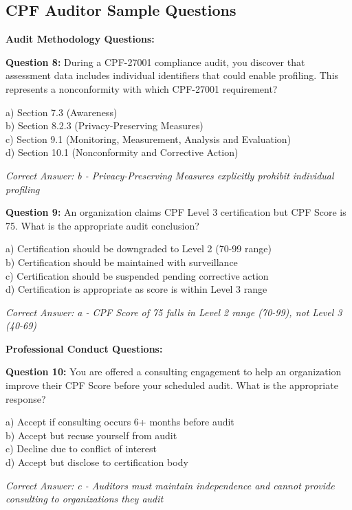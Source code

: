 \documentclass[11pt,a4paper]{article}
\begin{document}
\subsection{CPF Auditor Sample Questions}

\textbf{Audit Methodology Questions:}

\textbf{Question 8:} During a CPF-27001 compliance audit, you discover that assessment data includes individual identifiers that could enable profiling. This represents a nonconformity with which CPF-27001 requirement?

a) Section 7.3 (Awareness)\\
b) Section 8.2.3 (Privacy-Preserving Measures)\\
c) Section 9.1 (Monitoring, Measurement, Analysis and Evaluation)\\
d) Section 10.1 (Nonconformity and Corrective Action)

\textit{Correct Answer: b - Privacy-Preserving Measures explicitly prohibit individual profiling}

\textbf{Question 9:} An organization claims CPF Level 3 certification but CPF Score is 75. What is the appropriate audit conclusion?

a) Certification should be downgraded to Level 2 (70-99 range)\\
b) Certification should be maintained with surveillance\\
c) Certification should be suspended pending corrective action\\
d) Certification is appropriate as score is within Level 3 range

\textit{Correct Answer: a - CPF Score of 75 falls in Level 2 range (70-99), not Level 3 (40-69)}

\textbf{Professional Conduct Questions:}

\textbf{Question 10:} You are offered a consulting engagement to help an organization improve their CPF Score before your scheduled audit. What is the appropriate response?

a) Accept if consulting occurs 6+ months before audit\\
b) Accept but recuse yourself from audit\\
c) Decline due to conflict of interest\\
d) Accept but disclose to certification body

\textit{Correct Answer: c - Auditors must maintain independence and cannot provide consulting to organizations they audit}
\end{document}
